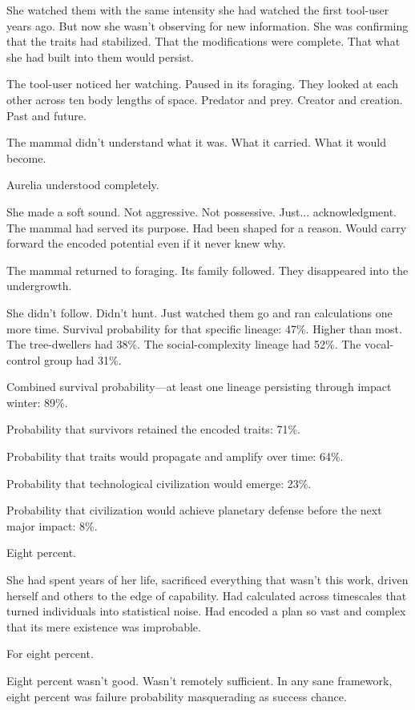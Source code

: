She watched them with the same intensity she had watched the first tool-user years ago. But now she wasn't observing for new information. She was confirming that the traits had stabilized. That the modifications were complete. That what she had built into them would persist.

The tool-user noticed her watching. Paused in its foraging. They looked at each other across ten body lengths of space. Predator and prey. Creator and creation. Past and future.

The mammal didn't understand what it was. What it carried. What it would become.

Aurelia understood completely.

She made a soft sound. Not aggressive. Not possessive. Just... acknowledgment. The mammal had served its purpose. Had been shaped for a reason. Would carry forward the encoded potential even if it never knew why.

The mammal returned to foraging. Its family followed. They disappeared into the undergrowth.

She didn't follow. Didn't hunt. Just watched them go and ran calculations one more time. Survival probability for that specific lineage: 47\%. Higher than most. The tree-dwellers had 38\%. The social-complexity lineage had 52\%. The vocal-control group had 31\%.

Combined survival probability—at least one lineage persisting through impact winter: 89\%.

Probability that survivors retained the encoded traits: 71\%.

Probability that traits would propagate and amplify over time: 64\%.

Probability that technological civilization would emerge: 23\%.

Probability that civilization would achieve planetary defense before the next major impact: 8\%.

Eight percent.

She had spent years of her life, sacrificed everything that wasn't this work, driven herself and others to the edge of capability. Had calculated across timescales that turned individuals into statistical noise. Had encoded a plan so vast and complex that its mere existence was improbable.

For eight percent.

Eight percent wasn't good. Wasn't remotely sufficient. In any sane framework, eight percent was failure probability masquerading as success chance.

